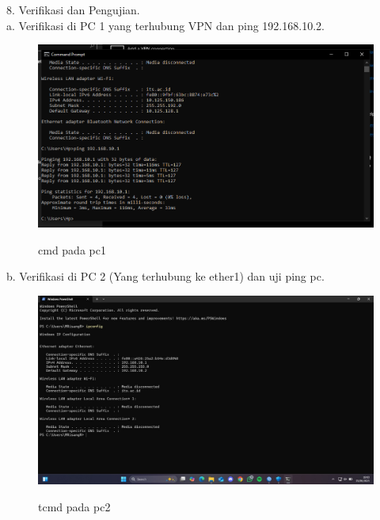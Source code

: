 8. Verifikasi dan Pengujian. \\
a. Verifikasi di PC 1 yang terhubung VPN dan ping 192.168.10.2.
\begin{figure}[H]
    \centering
    \includegraphics[width=0.65\linewidth]{image/tun3.png}
    \label{fig:inirujukan}
    \caption{cmd pada pc1}
\end{figure}
b. Verifikasi di PC 2 (Yang terhubung ke ether1) dan uji ping pc.
\begin{figure}[H]
    \centering
    \includegraphics[width=0.65\linewidth]{image/tun16.jpg}
    \label{fig:inirujukan}
    \caption{tcmd pada pc2}
\end{figure}

